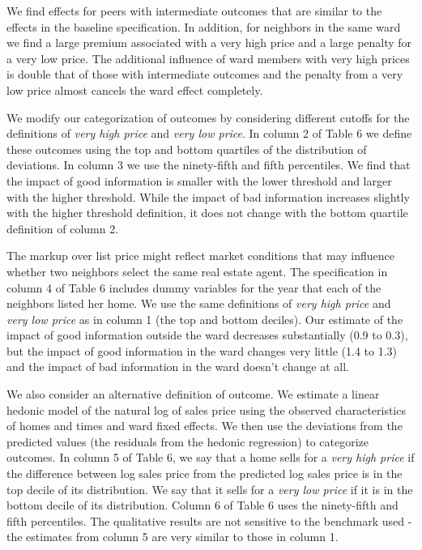 \documentclass[AEJ,draftmode]{AEA}
\begin{document}
    We find effects for peers with intermediate outcomes that are similar to the effects in the baseline specification. In addition, for neighbors in the same ward we find a large premium associated with a very high price and a large penalty for a very low price. The additional influence of ward members with very high prices is double that of those with intermediate outcomes and the penalty from a very low price almost cancels the ward effect completely.

    We modify our categorization of outcomes by considering different cutoffs for the definitions of \emph{very high price} and \emph{very low price}. In column 2 of Table 6 we define these outcomes using the top and bottom quartiles of the distribution of deviations. In column 3 we use the ninety-fifth and fifth percentiles. We find that the impact of good information is smaller with the lower threshold and larger with the higher threshold. While the impact of bad information increases slightly with the higher threshold definition, it does not change with the bottom quartile definition of column 2.

    The markup over list price might reflect market conditions that may influence whether two neighbors select the same real estate agent. The specification in column 4 of Table 6 includes dummy variables for the year that each of the neighbors listed her home. We use the same definitions of \emph{very high price} and  \emph{very low price} as in column 1 (the top and bottom deciles). Our estimate of the impact of good information outside the ward decreases substantially (0.9 to 0.3), but the impact of good information in the ward changes very little (1.4 to 1.3) and the impact of bad information in the ward doesn't change at all.

    We also consider an alternative definition of outcome. We estimate a linear hedonic model of the natural log of sales price using the observed characteristics of homes and times and ward fixed effects. We then use the deviations from the predicted values (the residuals from the hedonic regression) to categorize outcomes. In column 5 of Table 6, we say that a home sells for a \emph{very high price} if the difference between log sales price from the predicted log sales price is in the top decile of its distribution. We say that it sells for a \emph{very low price} if it is in the bottom decile of its distribution. Column 6 of Table 6 uses the ninety-fifth and fifth percentiles. The qualitative results are not sensitive to the benchmark used - the estimates from column 5 are very similar to those in column 1.
\end{document}
